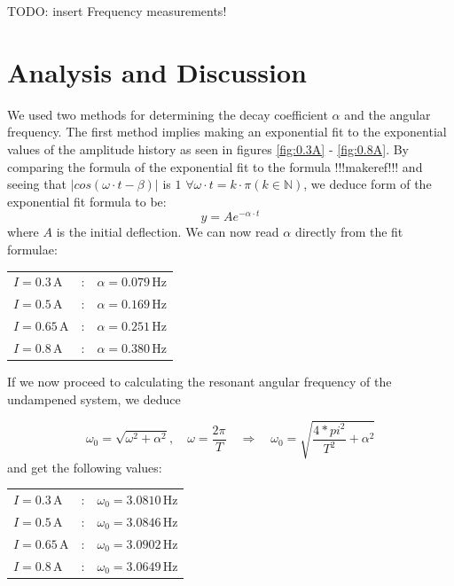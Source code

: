 \documentclass{scrreprt}
\newcommand{\unit}[1]{\ensuremath{\, \mathrm{#1}}}
\begin{document}
TODO: insert Frequency measurements!


\section{Analysis and Discussion}
We used two methods for determining the decay coefficient $\alpha$ and the angular frequency. The first method implies making an exponential fit to the exponential values of the amplitude history as seen in figures \ref{fig:0.3A} - \ref{fig:0.8A}.  By comparing the formula of the exponential fit to the formula !!!makeref!!! and seeing that $\lvert cos(\omega\cdot t-\beta)\rvert$ is $1$ $\forall \omega \cdot t = k \cdot \pi (k \in \mathbb{N})$, we deduce form of the exponential fit formula to be:
\begin{equation}
y = Ae^{- \alpha \cdot t}
\end{equation}
where $A$ is the initial deflection.
We can now read $\alpha$ directly from the fit formulae:

\begin{table}[h]
\center
\begin{tabular}{lcl}
$I = 0.3 \unit{A}$ &:& $\alpha = 0.079\unit{Hz}$\\
$I = 0.5 \unit{A}$ &:& $\alpha = 0.169\unit{Hz}$\\
$I = 0.65 \unit{A}$ &:& $\alpha = 0.251\unit{Hz}$\\
$I = 0.8 \unit{A}$ &:& $\alpha = 0.380\unit{Hz}$
\end{tabular}
\end{table}

If we now proceed to calculating the resonant angular frequency of the undampened system, we deduce

\begin{equation}
\omega_0 = \sqrt{\omega^2+\alpha^2}, \quad \omega = \frac{2 \pi}{T} \quad \Longrightarrow \quad \omega_0 = \sqrt{\frac{4*pi^2}{T^2} + \alpha^2}
\end{equation}
and get the following values:

\begin{table}[h]
\center
\begin{tabular}{lcl}
$I = 0.3 \unit{A}$ &:& $\omega_0 = 3.0810\unit{Hz}$\\
$I = 0.5 \unit{A}$ &:& $\omega_0 = 3.0846\unit{Hz}$\\
$I = 0.65 \unit{A}$ &:& $\omega_0 = 3.0902\unit{Hz}$\\
$I = 0.8 \unit{A}$ &:& $\omega_0 = 3.0649\unit{Hz}$
\end{tabular}
\end{table}
\end{document}
